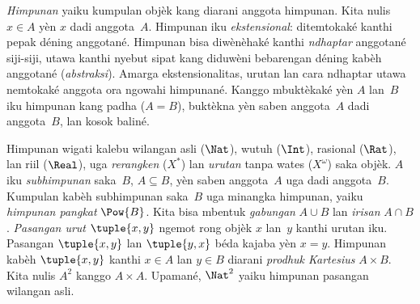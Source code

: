 \emph{Himpunan} yaiku kumpulan objèk kang diarani anggota himpunan.
Kita nulis $x \in A$ yèn $x$ dadi anggota~$A$. Himpunan iku
\emph{ekstensional}: ditemtokaké kanthi pepak déning anggotané.
Himpunan bisa diwènèhaké kanthi \emph{ndhaptar} anggotané siji-siji,
utawa kanthi nyebut sipat kang diduwèni bebarengan déning kabèh
anggotané (\emph{abstraksi}). Amarga ekstensionalitas, urutan lan
cara ndhaptar utawa nemtokaké anggota ora ngowahi himpunané.
Kanggo mbuktèkaké yèn $A$ lan~$B$ iku himpunan kang padha ($A=B$),
buktèkna yèn saben anggota~$A$ dadi anggota~$B$, lan kosok baliné.

Himpunan wigati kalebu wilangan asli ($\Nat$), wutuh ($\Int$),
rasional ($\Rat$), lan riil ($\Real$), uga \emph{rerangken}
($X^*$) lan \emph{urutan} tanpa wates ($X^\omega$) saka objèk.
$A$ iku \emph{subhimpunan} saka~$B$, $A\subseteq B$, yèn saben
anggota~$A$ uga dadi anggota~$B$. Kumpulan kabèh subhimpunan
saka~$B$ uga minangka himpunan, yaiku \emph{himpunan pangkat}
$\Pow{B}$. Kita bisa mbentuk \emph{gabungan} $A\cup B$ lan
\emph{irisan} $A\cap B$. \emph{Pasangan urut} $\tuple{x,y}$
ngemot rong objèk $x$ lan~$y$ kanthi urutan iku. Pasangan
$\tuple{x,y}$ lan $\tuple{y,x}$ béda kajaba yèn $x=y$.
Himpunan kabèh $\tuple{x,y}$ kanthi $x\in A$ lan $y\in B$
diarani \emph{prodhuk Kartesius} $A\times B$. Kita nulis $A^2$
kanggo $A\times A$. Upamané, $\Nat^2$ yaiku himpunan pasangan
wilangan asli.
